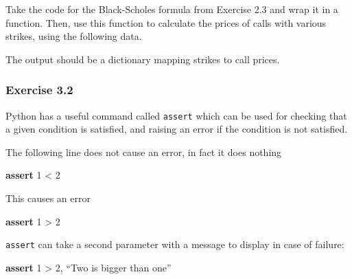 \documentclass[11pt]{article}
\newenvironment{Shaded}{}{}
\newcommand{\DecValTok}[1]{\textcolor[rgb]{0.25,0.63,0.44}{{#1}}}
\newcommand{\FloatTok}[1]{\textcolor[rgb]{0.25,0.63,0.44}{{#1}}}
\newcommand{\CommentTok}[1]{\textcolor[rgb]{0.38,0.63,0.69}{\textit{{#1}}}}
\newcommand{\NormalTok}[1]{{#1}}
\newcommand{\ControlFlowTok}[1]{\textcolor[rgb]{0.00,0.44,0.13}{\textbf{{#1}}}}
\newcommand{\OperatorTok}[1]{\textcolor[rgb]{0.40,0.40,0.40}{{#1}}}
\begin{document}
Take the code for the Black-Scholes formula from Exercise 2.3 and wrap
it in a function. Then, use this function to calculate the prices of
calls with various strikes, using the following data.

\begin{Shaded}
\end{Shaded}

The output should be a dictionary mapping strikes to call prices.

\hypertarget{exercise-3.2}{%
\subsubsection{Exercise 3.2}\label{exercise-3.2}}

Python has a useful command called \texttt{assert} which can be used for
checking that a given condition is satisfied, and raising an error if
the condition is not satisfied.

The following line does not cause an error, in fact it does nothing

\begin{Shaded}
\begin{Highlighting}[]
\ControlFlowTok{assert} \DecValTok{1} \OperatorTok{<} \DecValTok{2}
\end{Highlighting}
\end{Shaded}

This causes an error

\begin{Shaded}
\begin{Highlighting}[]
\ControlFlowTok{assert} \DecValTok{1} \OperatorTok{>} \DecValTok{2}
\end{Highlighting}
\end{Shaded}

\texttt{assert} can take a second parameter with a message to display in case of failure:

\begin{Shaded}
\begin{Highlighting}[]
\ControlFlowTok{assert} \DecValTok{1} \OperatorTok{>} \DecValTok{2}, ``Two is bigger than one''
\end{Highlighting}
\end{Shaded}
\end{document}
